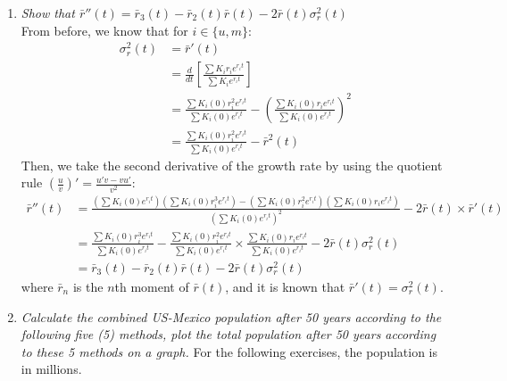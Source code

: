 \documentclass[]{book}
\providecommand{\tightlist}{%
  \setlength{\itemsep}{0pt}\setlength{\parskip}{0pt}}
\begin{document}
\begin{enumerate}
  \begin{enumerate}
  \def\labelenumii{\alph{enumii}.}
  \tightlist
  \item
    \emph{Show that \(\bar{r}''(t) = \bar{r}_3(t) - \bar{r}_2(t) \bar{r}(t) - 2 \bar{r}(t) \sigma^2_r(t)\)}\\
    From before, we know that for \(i\in\{u,m\}\):
    \[\begin{aligned}
     \sigma_r^2(t) &= \bar{r}'(t) \\
     & = \frac{d}{dt}\left[ \frac{ \sum K_i r_i e^{r_i t}} {\sum K_i  e^{r_i t}} \right]\\
     & = \frac{\sum K_i(0)r_i^2e^{r_it}} {\sum K_i(0)e^{r_it}} - \left(\frac{ \sum K_i(0)r_ie^{r_it}} {\sum K_i(0)e^{r_it}}\right)^2 \\
     & = \frac{\sum K_i(0)r_i^2e^{r_it}} {\sum K_i(0)e^{r_it}} - \bar{r}^2(t) 
     \end{aligned}\]
    Then, we take the second derivative of the growth rate by using the quotient rule \(\left(\frac{u}{v}\right)'= \frac{u'v-vu'}{v^2}\):
    \[\begin{aligned}
     \bar{r}''(t) &= { \frac{\left(\sum K_i(0)e^{r_it}\right)(\sum K_i(0)r_i^3e^{r_it}) -(\sum K_i(0)r_i^2e^{r_it})(\sum K_i(0)r_i e^{r_it})}  {(\sum K_i(0)e^{r_it})^2 }} - 2\bar{r}(t)\times\bar{r}'(t)\\ 
     &= \frac{ \sum K_i(0)r_i^3e^{r_it}} {\sum K_i(0)e^{r_it} } - \frac{ \sum K_i(0)r_i^2e^{r_it}} {\sum K_i(0)e^{r_it}}\times \frac{\sum K_i(0)r_i e^{r_it}}{\sum K_i(0)e^{r_it} } - 2\bar{r}(t)\sigma^2_r(t) \\
     &= \bar{r}_3 (t) - \bar{r}_2(t)\bar{r}(t) - 2\bar{r}(t)\sigma^2_r(t)
     \end{aligned}\]
    where \(\bar{r}_n\) is the \(n\)th moment of \(\bar{r}(t)\), and it is known that \(\bar{r}'(t) = \sigma^2_r(t)\).\\
  \item
    \emph{Calculate the combined US-Mexico population after 50 years according to the following five (5) methods, plot the total population after 50 years according to these 5 methods on a graph.}
    For the following exercises, the population is in millions.


\end{enumerate}
\end{enumerate}
\end{document}
